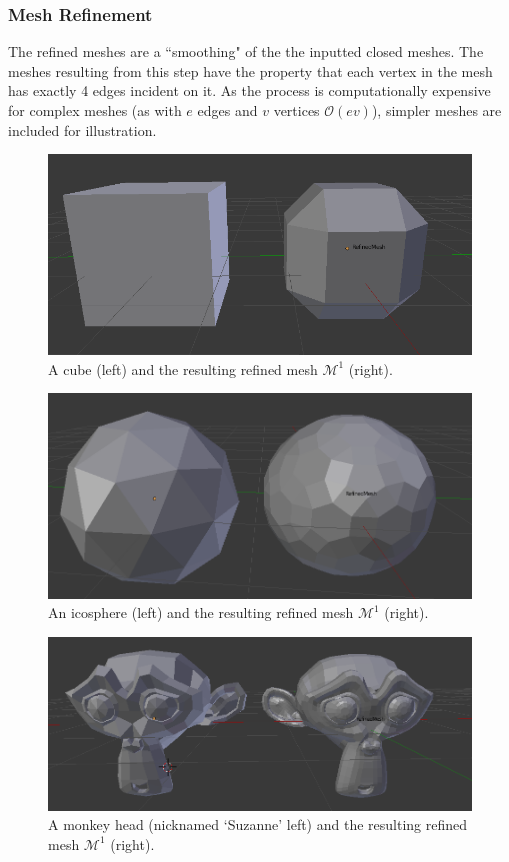 \documentclass[11pt]{article}
\begin{document}
	\subsubsection*{Mesh Refinement}
	\vspace{-0.1in}
	The refined meshes are a ``smoothing" of the the inputted closed meshes. The meshes resulting from this step have the property that each vertex in the mesh has exactly 4 edges incident on it. As the process is computationally expensive for complex meshes (as with $e$ edges and $v$ vertices  $\mathcal{O}(ev)$), simpler meshes are included for illustration.	
	\begin{figure}
			\centering
			\captionsetup{justification=centering}
			\includegraphics[width=.7\linewidth]{img/refine_cube}
			\caption{A cube (left) and the resulting refined mesh $\mathcal{M}^1$ (right).}
	\end{figure}	
	\begin{figure}
		\centering
		\captionsetup{justification=centering}
		\includegraphics[width=.7\linewidth]{img/refine_icosphere}
		\caption{An icosphere (left) and the resulting refined mesh $\mathcal{M}^1$ (right).}		
	\end{figure}
	\begin{figure}
		\centering
		\captionsetup{justification=centering}
		\includegraphics[width=.7\linewidth]{img/refine_monkey}
		\caption{A monkey head (nicknamed `Suzanne' left) and the resulting refined mesh $\mathcal{M}^1$ (right).}			
	\end{figure}
\end{document}
